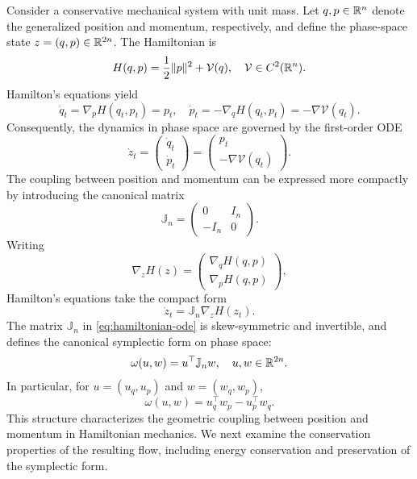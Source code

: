 \documentclass[12pt,a4paper,oneside]{book}
\begin{document}
Consider a conservative mechanical system with unit mass. Let $q,p\in\mathbb{R}^n$ denote the generalized position and momentum,
respectively, and define the phase-space state $z=(q,p)\in\mathbb{R}^{2n}$. The Hamiltonian is
\begin{equation*}
    H(q,p)=\frac12\|p\|^2+\mathcal V(q), \quad \mathcal V\in C^2(\mathbb{R}^n).
\end{equation*}
Hamilton's equations yield
\begin{equation*}
    \dot q_t=\nabla_p H(q_t,p_t)=p_t, \quad
    \dot p_t=-\nabla_q H(q_t,p_t) = -\nabla\mathcal V(q_t).
\end{equation*}
Consequently, the dynamics in phase space are governed by the first-order ODE
\begin{equation*}
    \dot z_t =
    \begin{pmatrix}
        \dot q_t\\
        \dot p_t
    \end{pmatrix}
    =
    \begin{pmatrix}
        p_t\\
        -\nabla\mathcal V(q_t)
    \end{pmatrix}.
\end{equation*}
The coupling between position and momentum can be expressed more
compactly by introducing the canonical matrix
\begin{equation*}
    \mathbb J_n=
    \begin{pmatrix}
        0&I_n\\
        -I_n&0
    \end{pmatrix}.
\end{equation*}
Writing
\begin{equation*}
    \nabla_z H(z)=
    \begin{pmatrix}
        \nabla_q H(q,p)\\
        \nabla_p H(q,p)
    \end{pmatrix},
\end{equation*}
Hamilton's equations take the compact form
\begin{equation}
    \dot z_t=\mathbb J_n\nabla_z H(z_t).
    \label{eq:hamiltonian-ode}
\end{equation}
The matrix $\mathbb J_n$ in \eqref{eq:hamiltonian-ode} is skew-symmetric and invertible, and
defines the canonical symplectic form on phase space:
\begin{equation*}
    \omega(u,w)=u^\top\mathbb J_n w, \quad u,w\in\mathbb{R}^{2n}.
\end{equation*}
In particular, for $u=(u_q,u_p)$ and $w=(w_q,w_p)$,
\begin{equation*}
    \omega(u,w)=u_q^\top w_p-u_p^\top w_q.
\end{equation*}
This structure characterizes the geometric coupling between position and momentum in Hamiltonian mechanics. We next examine
the conservation properties of the resulting flow, including energy conservation and preservation of the symplectic form.
\end{document}
